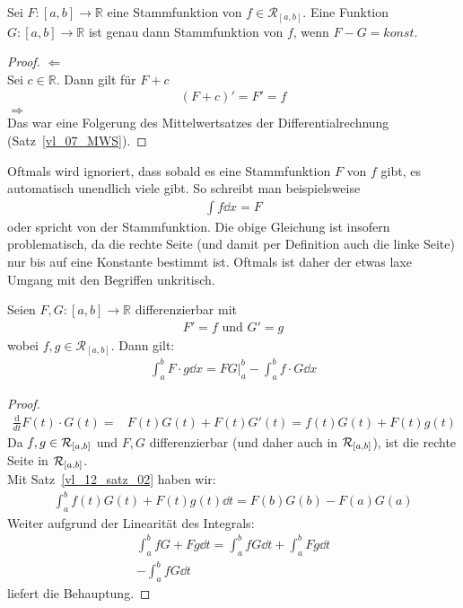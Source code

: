 \begin{Proposition}{
	Sei $F: [a,b] \rightarrow \mathbb{R}$ eine Stammfunktion von $f \in \mathcal{R}
	_{[a,b]}$. Eine Funktion $G: [a,b] \rightarrow \mathbb{R}$ ist genau dann 
	Stammfunktion von $f$, wenn $F-G = konst.$
}\end{Proposition}

\begin{proof}
	 $\Leftarrow$ \\
	Sei $c \in \mathbb{R}$. Dann gilt für $F + c$ 
	\begin{align*}
		(F+ c)' = F' = f
	\end{align*}
	$\Rightarrow$ \\
	Das war eine Folgerung des Mittelwertsatzes der Differentialrechnung 
	(Satz~\ref{vl_07_MWS}).
\end{proof}

\begin{Bemerkung}{
	Oftmals wird ignoriert, dass sobald es eine Stammfunktion $F$ von $f$ gibt, es 
	automatisch unendlich viele gibt. So schreibt man beispielsweise 
	\begin{align*}
		\int f \dd{x} = F
	\end{align*} 
	oder spricht von \glqq der\grqq{} Stammfunktion. Die obige Gleichung ist
	 insofern problematisch, da die rechte Seite (und damit per Definition auch die 
	 linke Seite) nur bis auf eine Konstante bestimmt ist. Oftmals ist daher der 
	 etwas laxe Umgang mit den Begriffen unkritisch.
}\end{Bemerkung}

\begin{Satz}{\label{vl_12_satz_03}
	Seien $F,G: [a,b] \rightarrow \mathbb{R}$ differenzierbar mit 
	\begin{align*}
		F' = f \text{ und } G' = g 
	\end{align*}
	wobei $f,g \in \mathcal{R}_{[a,b]}$. Dann gilt:
	\begin{align*}
		\int_a^b F \cdot g \dd{x} = FG\vert_a^b - \int_a^b f \cdot G \dd{x}
	\end{align*}
}\end{Satz}

\begin{proof}
	\begin{align}\label{vl_12_gl_1}
		\frac{\mathrm{d}}{dt}F(t)\cdot G(t) = & F(t)G(t) + F(t)G'(t) = 
		f(t)G(t) + F(t)g(t)
	\end{align}
	Da $f,g \in \mathcal{R}_{[{a},{b}]}$ und $F,G$ differenzierbar (und daher auch in 
	$\mathcal{R}_{[{a},{b}]}$), ist die rechte Seite in $\mathcal{R}_{[{a},{b}]}$. \\
	Mit Satz~\ref{vl_12_satz_02} haben wir:
	\begin{align*}
		\int_a^b f(t) G(t) + F(t)g(t) \dd{t} = F(b)G(b) -F(a)G(a)
	\end{align*}
	Weiter aufgrund der Linearität des Integrals:
	\begin{align*}
		\int_a^bfG + Fg \dd{t} = \int_a^b fG\dd{t} + \int_a^b Fg\dd{t} \\
		-\int_a^b fG\dd{t}
	\end{align*}
	liefert die Behauptung.
\end{proof}

